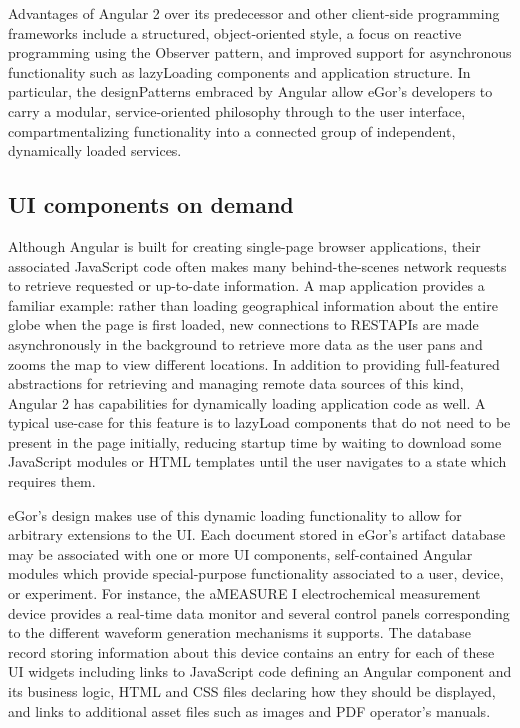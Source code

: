 \documentclass[../thesis]{subfiles}
\begin{document}
Advantages of Angular 2 over its predecessor and other client-side
programming frameworks include a structured, object-oriented style, a
focus on reactive programming using the Observer pattern, and improved
support for asynchronous functionality such as \gls{lazyLoad}ing
components and application structure. In particular, the
\glspl{designPattern} embraced by Angular allow eGor's developers to
carry a modular, service-oriented philosophy through to the user
interface, compartmentalizing functionality into a connected group of
independent, dynamically loaded services.

\subsection{UI components on demand}
Although Angular is built for creating single-page browser
applications, their associated JavaScript code often makes many
behind-the-scenes network requests to retrieve requested or up-to-date
information. A map application provides a familiar example: rather
than loading geographical information about the entire globe when the
page is first loaded, new connections to \glspl{RESTAPI} are made
asynchronously in the background to retrieve more data as the user
pans and zooms the map to view different locations. In addition to
providing full-featured abstractions for retrieving and managing
remote data sources of this kind, Angular 2 has capabilities for
dynamically loading application code as well. A typical use-case for
this feature is to \gls{lazyLoad} components that do not need to be
present in the page initially, reducing startup time by waiting to
download some JavaScript modules or HTML templates until the user
navigates to a state which requires them.

eGor's design makes use of this dynamic loading functionality to allow
for arbitrary extensions to the \gls{UI}. Each document stored
in eGor's artifact database may be associated with one or more
\gls{UI} components, self-contained Angular modules which provide
special-purpose functionality associated to a user, device, or
experiment. For instance, the aMEASURE I electrochemical measurement
device provides a real-time data monitor and several control panels
corresponding to the different waveform generation mechanisms it
supports. The database record storing information about this
device contains an entry for each of these \gls{UI} widgets including
links to JavaScript code defining an Angular component and its
business logic, HTML and CSS files declaring how they should be
displayed, and links to additional asset files such as images and PDF
operator's manuals.
\end{document}
